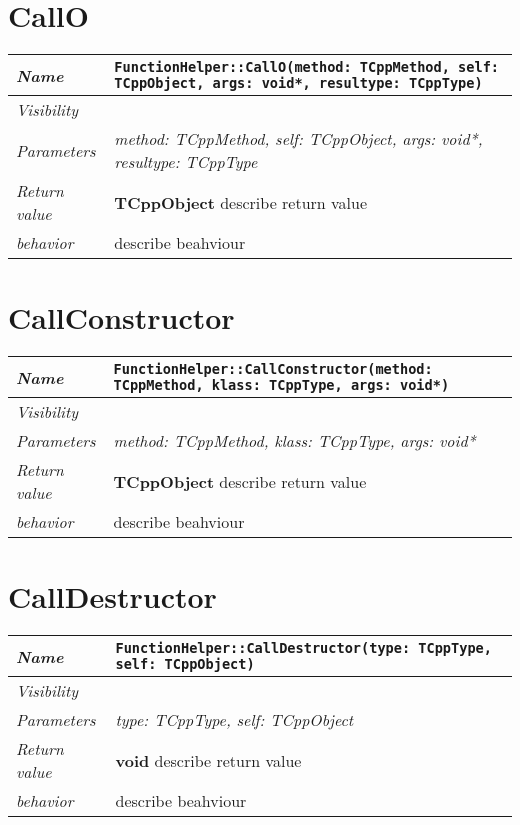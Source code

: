  \section{CallO}
\begin{longtable}{p{3cm} @{\hskip 1cm} p{12cm}}
 \hline
\textit{Name} & \texttt{FunctionHelper::CallO(method: TCppMethod, self: TCppObject, args: void*, resultype: TCppType)}\\
\hline
 \textit{Visibility} & \\
\hline
\textit{Parameters} & \textit{method: TCppMethod, self: TCppObject, args: void*, resultype: TCppType}\\
\hline
\textit{Return value} & \textbf{ TCppObject} describe return value\\
  \hline
 \textit{behavior} & describe beahviour \\
\hline
\end{longtable} \pagebreak
 \section{CallConstructor}
\begin{longtable}{p{3cm} @{\hskip 1cm} p{12cm}}
 \hline
\textit{Name} & \texttt{FunctionHelper::CallConstructor(method: TCppMethod, klass: TCppType, args: void*)}\\
\hline
 \textit{Visibility} & \\
\hline
\textit{Parameters} & \textit{method: TCppMethod, klass: TCppType, args: void*}\\
\hline
\textit{Return value} & \textbf{ TCppObject} describe return value\\
  \hline
 \textit{behavior} & describe beahviour \\
\hline
\end{longtable} \pagebreak
 \section{CallDestructor}
\begin{longtable}{p{3cm} @{\hskip 1cm} p{12cm}}
 \hline
\textit{Name} & \texttt{FunctionHelper::CallDestructor(type: TCppType, self: TCppObject)}\\
\hline
 \textit{Visibility} & \\
\hline
\textit{Parameters} & \textit{type: TCppType, self: TCppObject}\\
\hline
\textit{Return value} & \textbf{ void} describe return value\\
  \hline
 \textit{behavior} & describe beahviour \\
\hline
\end{longtable} \pagebreak
